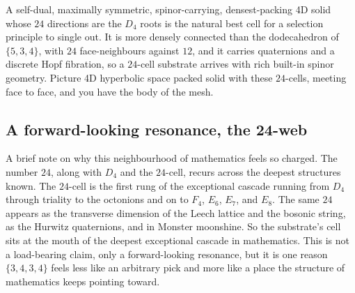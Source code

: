 A self-dual, maximally symmetric, spinor-carrying, densest-packing 4D solid whose $24$ directions are the $D_4$ roots is the natural best cell for a selection principle to single out. It is more densely connected than the dodecahedron of $\{5,3,4\}$, with $24$ face-neighbours against $12$, and it carries quaternions and a discrete Hopf fibration, so a $24$-cell substrate arrives with rich built-in spinor geometry. Picture 4D hyperbolic space packed solid with these $24$-cells, meeting face to face, and you have the body of the mesh.

\subsection{A forward-looking resonance, the 24-web}

A brief note on why this neighbourhood of mathematics feels so charged. The number $24$, along with $D_4$ and the $24$-cell, recurs across the deepest structures known. The $24$-cell is the first rung of the exceptional cascade running from $D_4$ through triality to the octonions and on to $F_4$, $E_6$, $E_7$, and $E_8$. The same $24$ appears as the transverse dimension of the Leech lattice and the bosonic string, as the Hurwitz quaternions, and in Monster moonshine. So the substrate's cell sits at the mouth of the deepest exceptional cascade in mathematics. This is not a load-bearing claim, only a forward-looking resonance, but it is one reason $\{3,4,3,4\}$ feels less like an arbitrary pick and more like a place the structure of mathematics keeps pointing toward.
